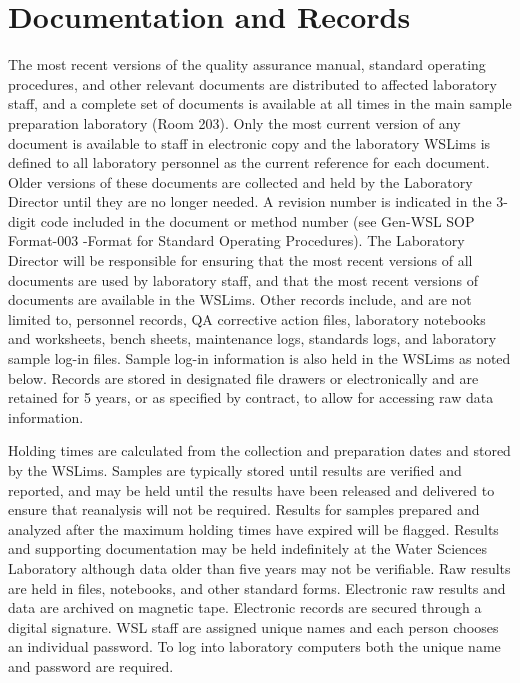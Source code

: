 \section{Documentation and Records}
The most recent versions of the quality assurance manual, 
standard operating procedures, and other relevant documents are 
distributed to affected laboratory staff, and a complete set of 
documents is available at all times in the main sample preparation 
laboratory (Room 203). Only the most current version of any document is 
available to staff in electronic copy and the laboratory WSLims is 
defined to all laboratory personnel as the current reference for each 
document. Older versions of these documents are collected and held by 
the Laboratory Director until they are no longer needed. A revision 
number is indicated in the 3-digit code included in the document or 
method number (see Gen-WSL SOP Format-003 -Format for Standard Operating 
Procedures). The Laboratory Director will be responsible for ensuring 
that the most recent versions of all documents are used by laboratory 
staff, and that the most recent versions of documents are available in 
the WSLims. Other records include, and are not limited to, personnel 
records, QA corrective action files, laboratory notebooks and 
worksheets, bench sheets, maintenance logs, standards logs, and 
laboratory sample log-in files. Sample log-in information is also held 
in the WSLims as noted below. Records are stored in designated file 
drawers or electronically and are retained for 5 years, or as specified 
by contract, to allow for accessing raw data information. 

Holding times are calculated from the collection and preparation dates 
and stored by the WSLims. Samples are typically stored until results are 
verified and reported, and may be held until the results have been 
released and delivered to ensure that reanalysis will not be required. 
Results for samples prepared and analyzed after the maximum holding 
times have expired will be flagged. Results and supporting documentation 
may be held indefinitely at the Water Sciences Laboratory although data 
older than five years may not be verifiable. Raw results are held in 
files, notebooks, and other standard forms. Electronic raw results and 
data are archived on magnetic tape. Electronic records are secured 
through a digital signature. WSL staff are assigned unique names and 
each person chooses an individual password. To log into laboratory 
computers both the unique name and password are required.

